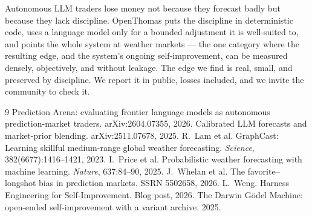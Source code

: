\documentclass[sigconf,review,anonymous]{acmart}
\begin{document}
Autonomous LLM traders lose money not because they forecast badly but because they
lack discipline. OpenThomas puts the discipline in deterministic code, uses a
language model only for a bounded adjustment it is well-suited to, and points the
whole system at weather markets --- the one category where the resulting edge, and
the system's ongoing self-improvement, can be measured densely, objectively, and
without leakage. The edge we find is real, small, and preserved by discipline. We
report it in public, losses included, and we invite the community to check it.

\begin{thebibliography}{9}
 Prediction Arena: evaluating frontier language models as
autonomous prediction-market traders. arXiv:2604.07355, 2026.
 Calibrated LLM forecasts and market-prior blending.
arXiv:2511.07678, 2025.
 R.~Lam et al. GraphCast: Learning skillful medium-range global
weather forecasting. \emph{Science}, 382(6677):1416--1421, 2023.
 I.~Price et al. Probabilistic weather forecasting with machine
learning. \emph{Nature}, 637:84--90, 2025.
 J.~Whelan et al. The favorite--longshot bias in prediction
markets. SSRN 5502658, 2026.
 L.~Weng. Harness Engineering for Self-Improvement. Blog post,
2026.
 The Darwin G\"odel Machine: open-ended self-improvement with a
variant archive. 2025.
\end{thebibliography}
\end{document}
